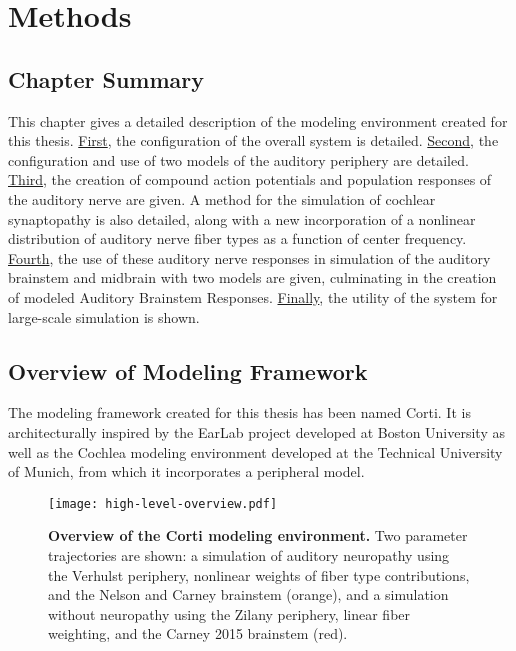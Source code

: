 \chapter{Methods}
\label{chapter:Methods}
\thispagestyle{myheadings}

\graphicspath{{4_Methods/Figures/}}

\section{Chapter Summary} %
\label{sec:methodsummary}
This chapter gives a detailed description of the modeling environment created for this thesis.  \hyperref[sec:overview_of_modeling_framework]{First}, the configuration of the overall system is detailed.  \hyperref[sec:peripheral_models]{Second}, the configuration and use of two models of the auditory periphery are detailed.  \hyperref[sec:auditory_nerve_response_models]{Third}, the creation of compound action potentials and population responses of the auditory nerve are given.  A method for the simulation of cochlear synaptopathy is also detailed, along with a new incorporation of a nonlinear distribution of auditory nerve fiber types as a function of center frequency.  \hyperref[sec:brainstem_models]{Fourth}, the use of these auditory nerve responses in simulation of the auditory brainstem and midbrain with two models are given, culminating in the creation of modeled Auditory Brainstem Responses.  \hyperref[sub:automated_parameter_exploration]{Finally}, the utility of the system for large-scale simulation is shown. 

\section{Overview of Modeling Framework} %
\label{sec:overview_of_modeling_framework}
The modeling framework created for this thesis has been named Corti\citep{Voysey2016Corti}. It is architecturally inspired by the EarLab project developed at Boston University as well as the Cochlea\citep{Rudnicki2014Cochlea} modeling environment developed at the Technical University of Munich, from which it incorporates a peripheral model. 

\begin{figure}[htbp]
	\centering
	\texttt{[image: high-level-overview.pdf]}
	\caption[Overview of the Corti modeling environment.]{\textbf{Overview of the Corti modeling environment.} Two parameter trajectories are shown: a simulation of auditory neuropathy using the Verhulst periphery, nonlinear weights of fiber type contributions, and the Nelson and Carney brainstem (orange), and a simulation without neuropathy using the Zilany periphery, linear fiber weighting, and the Carney 2015 brainstem (red).}
	\label{fig:corti-overview}
	\end{figure}

